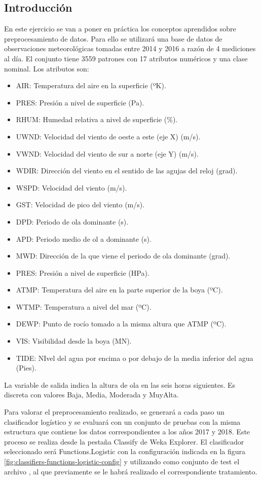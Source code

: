\subsection{Introducción}
En este ejercicio se van a poner en práctica los conceptos aprendidos sobre preprocesamiento de datos. Para ello se utilizará una base de datos de observaciones meteorológicas tomadas entre 2014 y 2016 a razón de 4 mediciones al día. El conjunto tiene 3559 patrones con 17 atributos numéricos y una clase nominal. Los atributos son:
\begin{itemize}
    \item AIR: Temperatura del aire en la superficie (ºK).
    \item PRES: Presión a nivel de superficie (Pa).
    \item RHUM: Humedad relativa a nivel de superficie (\%).
    \item UWND: Velocidad del viento de oeste a este (eje X) (m/s).
    \item VWND: Velocidad del viento de sur a norte (eje Y) (m/s).
    \item WDIR: Dirección del viento en el sentido de las agujas del reloj (grad).
    \item WSPD: Velocidad del viento (m/s).
    \item GST: Velocidad de pico del viento (m/s).
    \item DPD: Periodo de ola dominante (s).
    \item APD: Periodo medio de ol a dominante (s).
    \item MWD: Dirección de la que viene el periodo de ola dominante (grad).
    \item PRES: Presión a nivel de superficie (HPa).
    \item ATMP: Temperatura del aire en la parte superior de la boya (ºC).
    \item WTMP: Temperatura a nivel del mar (ºC).
    \item DEWP: Punto de rocío tomado a la misma altura que ATMP (ºC).
    \item VIS: Visibilidad desde la boya (MN).
    \item TIDE: NIvel del agua por encima o por debajo de la media inferior del agua (Pies).
\end{itemize}
La variable de salida indica la altura de ola en las seis horas siguientes. Es discreta con valores Baja, Media, Moderada y MuyAlta.

Para valorar el preprocesamiento realizado, se generará a cada paso un clasificador logístico y se evaluará con un conjunto de pruebas con la misma estructura que contiene los datos correspondientes a los años 2017 y 2018. Este proceso se realiza desde la pestaña Classify de Weka Explorer. El clasificador seleccionado será Functions.Logistic con la configuración indicada en la figura \ref{fig:classifiers-functions-logistic-config} y utilizando como conjunto de test el archivo , al que previamente se le habrá realizado el correspondiente tratamiento.

